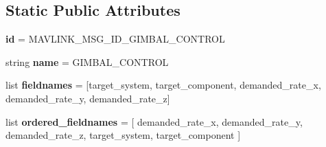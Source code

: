 \subsection*{Static Public Attributes}
\begin{DoxyCompactItemize}
\item 
\mbox{\label{classpymavlink_1_1dialects_1_1v10_1_1MAVLink__gimbal__control__message_aca113c5b35018f677dd2d1b9d23aaf6f}} 
{\bfseries id} = M\+A\+V\+L\+I\+N\+K\+\_\+\+M\+S\+G\+\_\+\+I\+D\+\_\+\+G\+I\+M\+B\+A\+L\+\_\+\+C\+O\+N\+T\+R\+OL
\item 
\mbox{\label{classpymavlink_1_1dialects_1_1v10_1_1MAVLink__gimbal__control__message_ad554a628e20e0348c3276c3f81b97f94}} 
string {\bfseries name} = \textquotesingle{}G\+I\+M\+B\+A\+L\+\_\+\+C\+O\+N\+T\+R\+OL\textquotesingle{}
\item 
\mbox{\label{classpymavlink_1_1dialects_1_1v10_1_1MAVLink__gimbal__control__message_a21afe807e1d1ae187d63344b57aa8622}} 
list {\bfseries fieldnames} = \mbox{[}\textquotesingle{}target\+\_\+system\textquotesingle{}, \textquotesingle{}target\+\_\+component\textquotesingle{}, \textquotesingle{}demanded\+\_\+rate\+\_\+x\textquotesingle{}, \textquotesingle{}demanded\+\_\+rate\+\_\+y\textquotesingle{}, \textquotesingle{}demanded\+\_\+rate\+\_\+z\textquotesingle{}\mbox{]}
\item 
\mbox{\label{classpymavlink_1_1dialects_1_1v10_1_1MAVLink__gimbal__control__message_a852186b463b8f2a37d67f3e0bb70a33d}} 
list {\bfseries ordered\+\_\+fieldnames} = \mbox{[} \textquotesingle{}demanded\+\_\+rate\+\_\+x\textquotesingle{}, \textquotesingle{}demanded\+\_\+rate\+\_\+y\textquotesingle{}, \textquotesingle{}demanded\+\_\+rate\+\_\+z\textquotesingle{}, \textquotesingle{}target\+\_\+system\textquotesingle{}, \textquotesingle{}target\+\_\+component\textquotesingle{} \mbox{]}
\item 
\mbox{\label{classpymavlink_1_1dialects_1_1v10_1_1MAVLink__gimbal__control__message_abf76401a1b1193af55116d994afcc9f3}} 

\end{DoxyCompactItemize}
